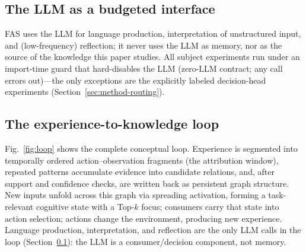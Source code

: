 \documentclass[10pt,a4paper]{article}
\begin{document}
\subsection{The LLM as a budgeted interface}
\label{sec:arch-llm}
FAS uses the LLM for language production, interpretation of unstructured input, and (low-frequency) reflection; it never uses the LLM as memory, nor as the source of the knowledge this paper studies. All subject experiments run under an import-time guard that hard-disables the LLM (zero-LLM contract; any call errors out)---the only exceptions are the explicitly labeled decision-head experiments (Section~\ref{sec:method-routing}).

\subsection{The experience-to-knowledge loop}
\label{sec:arch-loop}
Fig.~\ref{fig:loop} shows the complete conceptual loop. Experience is segmented into temporally ordered action--observation fragments (the attribution window), repeated patterns accumulate evidence into candidate relations, and, after support and confidence checks, are written back as persistent graph structure. New inputs unfold across this graph via spreading activation, forming a task-relevant cognitive state with a Top-$k$ focus; consumers carry that state into action selection; actions change the environment, producing new experience. Language production, interpretation, and reflection are the only LLM calls in the loop (Section~\ref{sec:arch-llm}): the LLM is a consumer/decision component, not memory.
\end{document}
